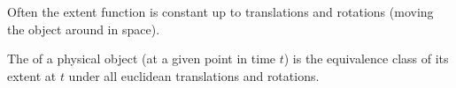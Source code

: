 \begin{module}[id=physobj]
\begin{omtext}
  Often the extent function is constant up to translations and rotations (moving the
  object around in space).
\end{omtext}

\begin{definition}
  The  of a physical object (at a given point in time $t$) is the
  equivalence class of its extent at $t$ under all euclidean translations and rotations.
\end{definition}

\end{module}

